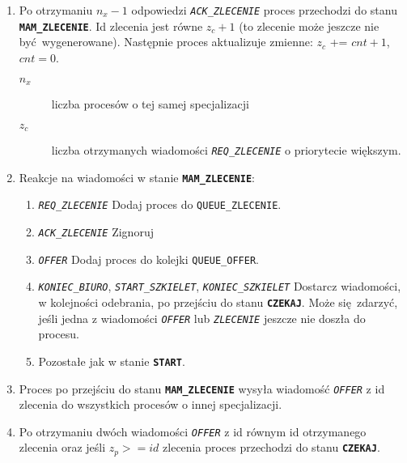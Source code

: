 \documentclass[12pt]{article}
\newcommand{\state}[1]{\texttt{\textbf{#1}}}
\newcommand{\msg}[1]{\texttt{\emph{#1}}}
\newcommand{\var}[1]{\texttt{#1}}
\begin{document}
\begin{enumerate}
	\item Po otrzymaniu $n_x - 1$ odpowiedzi \msg{ACK\_ZLECENIE} proces przechodzi do stanu \state{MAM\_ZLECENIE}. Id zlecenia jest równe $z_c + 1$ (to zlecenie może jeszcze nie być wygenerowane). Następnie proces aktualizuje zmienne: $z_c$ += $cnt + 1$, $cnt = 0$.
	\begin{description}
		\item[$n_x$] liczba procesów o tej samej specjalizacji
		\item[$z_c$] liczba otrzymanych wiadomości \msg{REQ\_ZLECENIE} o priorytecie większym.
	\end{description}
			
	\item Reakcje na wiadomości w stanie \state{MAM\_ZLECENIE}:
	\begin{enumerate}
		\item \msg{REQ\_ZLECENIE} Dodaj proces do \var{QUEUE\_ZLECENIE}.
		\item \msg{ACK\_ZLECENIE} Zignoruj
		\item \msg{OFFER} Dodaj proces do kolejki \var{QUEUE\_OFFER}.
		\item \msg{KONIEC\_BIURO}, \msg{START\_SZKIELET}, \msg{KONIEC\_SZKIELET} Dostarcz wiadomości, w kolejności odebrania, po przejściu do stanu \state{CZEKAJ}. Może się zdarzyć, jeśli jedna z wiadomości \msg{OFFER} lub \msg{ZLECENIE} jeszcze nie doszła do procesu.
		\item  Pozostałe jak w stanie \state{START}.
	\end{enumerate}
	
	\item Proces po przejściu do stanu \state{MAM\_ZLECENIE} wysyła wiadomość \msg{OFFER} z id zlecenia do wszystkich procesów o innej specjalizacji.
	
	\item Po otrzymaniu dwóch wiadomości \msg{OFFER} z id równym id otrzymanego zlecenia oraz jeśli $z_p >= id$ zlecenia proces przechodzi do stanu \state{CZEKAJ}.
\end{enumerate}
\end{document}
